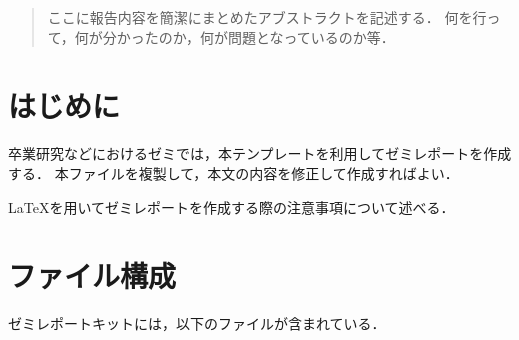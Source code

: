 \documentclass[uplatex]{jsarticle}
\date{2023/04/17}		%
\author{鈴木 秀和}		%
\begin{document}


\begin{abstract}
ここに報告内容を簡潔にまとめたアブストラクトを記述する．
何を行って，何が分かったのか，何が問題となっているのか等．
\end{abstract}



\section{はじめに}

卒業研究などにおけるゼミでは，本テンプレートを利用してゼミレポートを作成する．
本ファイルを複製して，本文の内容を修正して作成すればよい．

\LaTeX を用いてゼミレポートを作成する際の注意事項について述べる．


\section{ファイル構成}

ゼミレポートキットには，以下のファイルが含まれている．
\end{document}

